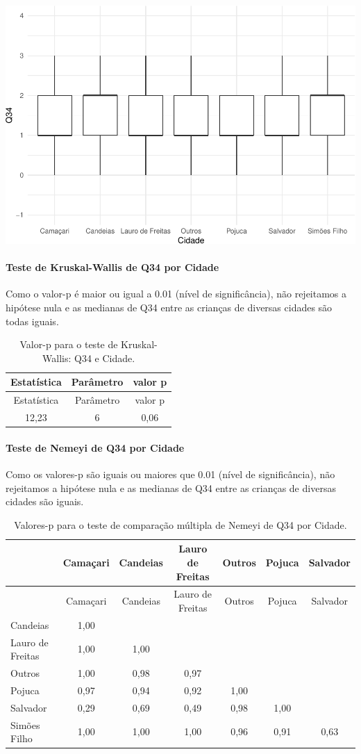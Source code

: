 \documentclass[]{article}
\let\oldparagraph\paragraph
\renewcommand{\paragraph}[1]{\oldparagraph{#1}\mbox{}}
\begin{document}
\begin{center}\includegraphics[width=0.75\linewidth]{relatorio_covid19_files/figure-latex/unnamed-chunk-1198-1} \end{center}

\hypertarget{teste-de-kruskal-wallis-de-q34-por-cidade}{%
\paragraph{Teste de Kruskal-Wallis de Q34 por Cidade}\label{teste-de-kruskal-wallis-de-q34-por-cidade}}

Como o valor-p é maior ou igual a 0.01 (nível de significância), não rejeitamos a hipótese nula e as medianas de Q34 entre as crianças de diversas cidades são todas iguais.

\begin{longtable}[]{@{}ccc@{}}
\caption{\label{tab:unnamed-chunk-1200}Valor-p para o teste de Kruskal-Wallis: Q34 e Cidade.}\tabularnewline
\toprule
Estatística & Parâmetro & valor p\tabularnewline
\midrule
\endfirsthead
\toprule
Estatística & Parâmetro & valor p\tabularnewline
\midrule
\endhead
12,23 & 6 & 0,06\tabularnewline
\bottomrule
\end{longtable}

\hypertarget{teste-de-nemeyi-de-q34-por-cidade}{%
\paragraph{Teste de Nemeyi de Q34 por Cidade}\label{teste-de-nemeyi-de-q34-por-cidade}}

Como os valores-p são iguais ou maiores que 0.01 (nível de significância), não rejeitamos a hipótese nula e as medianas de Q34 entre as crianças de diversas cidades são iguais.

\begin{longtable}[]{@{}lcccccc@{}}
\caption{\label{tab:unnamed-chunk-1202}Valores-p para o teste de comparação múltipla de Nemeyi de Q34 por Cidade.}\tabularnewline
\toprule
& Camaçari & Candeias & Lauro de Freitas & Outros & Pojuca & Salvador\tabularnewline
\midrule
\endfirsthead
\toprule
& Camaçari & Candeias & Lauro de Freitas & Outros & Pojuca & Salvador\tabularnewline
\midrule
\endhead
Candeias & 1,00 & & & & &\tabularnewline
Lauro de Freitas & 1,00 & 1,00 & & & &\tabularnewline
Outros & 1,00 & 0,98 & 0,97 & & &\tabularnewline
Pojuca & 0,97 & 0,94 & 0,92 & 1,00 & &\tabularnewline
Salvador & 0,29 & 0,69 & 0,49 & 0,98 & 1,00 &\tabularnewline
Simões Filho & 1,00 & 1,00 & 1,00 & 0,96 & 0,91 & 0,63\tabularnewline
\bottomrule
\end{longtable}
\end{document}
